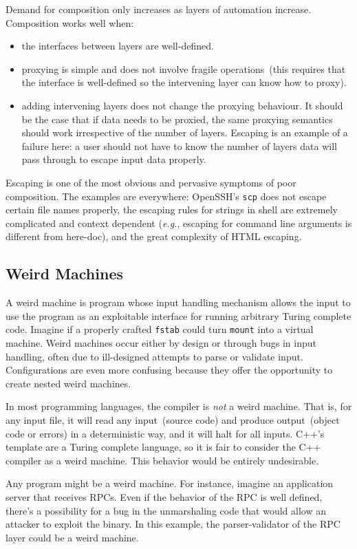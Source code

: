 \documentclass[letterpaper,twocolumn,10pt]{article}
\begin{document}
Demand for composition only increases as layers of automation increase. Composition works well when:

\begin{itemize}
\item the interfaces between layers are well-defined.
\item proxying is simple and does not involve fragile operations~(this requires that the interface is well-defined so the intervening layer can know how to proxy).
\item adding intervening layers does not change the proxying behaviour. It should be the case that if data needs to be proxied, the same proxying semantics should work irrespective of the number of layers. Escaping is an example of a failure here: a user should not have to know the number of layers data will pass through to escape input data properly.
\end{itemize}

Escaping is one of the most obvious and pervasive symptoms of poor composition. The examples are everywhere: OpenSSH's \texttt{scp} does not escape certain file names properly, the escaping rules for strings in shell are extremely complicated and context dependent (\emph{e.g.}, escaping for command line arguments is different from here-doc), and the great complexity of HTML escaping.

\subsection{Weird Machines}
A weird machine is program whose input handling mechanism allows the input to use the program as an exploitable interface for running arbitrary Turing complete code. Imagine if a properly crafted \texttt{fstab} could turn \texttt{mount} into a virtual machine. Weird machines occur either by design or through bugs in input handling, often due to ill-designed attempts to parse or validate input. Configurations are even more confusing because they offer the opportunity to create nested weird machines.

In most programming languages, the compiler is \emph{not} a weird machine. That is, for any input file, it will read any input~(source code) and produce output~(object code or errors) in a deterministic way, and it will halt for all inputs. C++'s template are a Turing complete language, so it is fair to consider the C++ compiler as a weird machine. This behavior would be entirely undesirable.

Any program might be a weird machine. For instance, imagine an application server that receives RPCs. Even if the behavior of the RPC is well defined, there's a possibility for a bug in the unmarshaling code that would allow an attacker to exploit the binary. In this example, the parser-validator of the RPC layer could be a weird machine.
\end{document}
